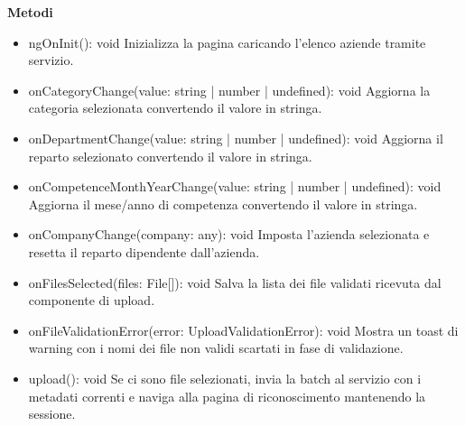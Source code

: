 \documentclass[a4paper,11pt]{article}
\begin{document}
\textbf{Metodi}

\begin{itemize}[noitemsep, topsep=0pt]
\item ngOnInit(): void
Inizializza la pagina caricando l’elenco aziende tramite servizio.

\item onCategoryChange(value: string | number | undefined): void
Aggiorna la categoria selezionata convertendo il valore in stringa.

\item onDepartmentChange(value: string | number | undefined): void
Aggiorna il reparto selezionato convertendo il valore in stringa.

\item onCompetenceMonthYearChange(value: string | number | undefined): void
Aggiorna il mese/anno di competenza convertendo il valore in stringa.

\item onCompanyChange(company: any): void
Imposta l’azienda selezionata e resetta il reparto dipendente dall’azienda.

\item onFilesSelected(files: File[]): void
Salva la lista dei file validati ricevuta dal componente di upload.

\item onFileValidationError(error: UploadValidationError): void
Mostra un toast di warning con i nomi dei file non validi scartati in fase di validazione.

\item upload(): void
Se ci sono file selezionati, invia la batch al servizio con i metadati correnti e naviga alla pagina di riconoscimento mantenendo la sessione.
\end{itemize}
\end{document}
